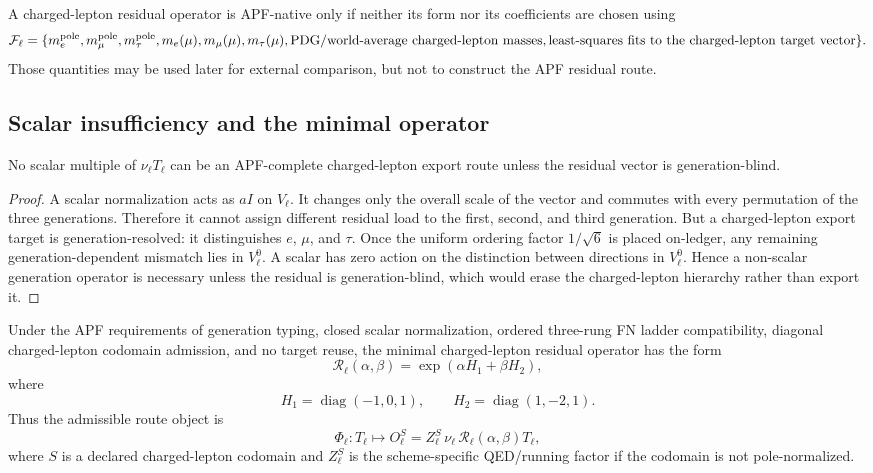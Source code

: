 \begin{definition}
A charged-lepton residual operator is APF-native only if neither its form nor its coefficients are chosen using
\[
        \mathcal F_\ell=
        \{m_e^{\rm pole},m_\mu^{\rm pole},m_\tau^{\rm pole},
        m_e(\mu),m_\mu(\mu),m_\tau(\mu),
        \hbox{PDG/world-average charged-lepton masses},
        \hbox{least-squares fits to the charged-lepton target vector}\}.
\]
Those quantities may be used later for external comparison, but not to construct the APF residual route.
\end{definition}

\subsection{Scalar insufficiency and the minimal operator}

\begin{lemma}
\label{lem:scalar-insufficiency-v38}
No scalar multiple of \(\nu_\ell T_\ell\) can be an APF-complete charged-lepton export route unless the residual vector is generation-blind.
\end{lemma}

\begin{proof}
A scalar normalization acts as \(a I\) on \(V_\ell\).  It changes only the overall scale of the vector and commutes with every permutation of the three generations.  Therefore it cannot assign different residual load to the first, second, and third generation.  But a charged-lepton export target is generation-resolved: it distinguishes \(e\), \(\mu\), and \(\tau\).  Once the uniform ordering factor \(1/\sqrt6\) is placed on-ledger, any remaining generation-dependent mismatch lies in \(V_\ell^0\).  A scalar has zero action on the distinction between directions in \(V_\ell^0\).  Hence a non-scalar generation operator is necessary unless the residual is generation-blind, which would erase the charged-lepton hierarchy rather than export it. \qedhere
\end{proof}

\begin{theorem}
\label{thm:charged-lepton-residual-operator-form-v38}
Under the APF requirements of generation typing, closed scalar normalization, ordered three-rung FN ladder compatibility, diagonal charged-lepton codomain admission, and no target reuse, the minimal charged-lepton residual operator has the form
\[
        \mathcal R_\ell(\alpha,\beta)
        =\exp\!\left(\alpha H_1+\beta H_2\right),
\]
where
\[
        H_1=\operatorname{diag}(-1,0,1),
        \qquad
        H_2=\operatorname{diag}(1,-2,1).
\]
Thus the admissible route object is
\[
        \Phi_\ell:
        T_\ell\longmapsto
        O_\ell^S
        =Z_\ell^S\,\nu_\ell\,
        \mathcal R_\ell(\alpha,\beta)T_\ell,
\]
where \(S\) is a declared charged-lepton codomain and \(Z_\ell^S\) is the scheme-specific QED/running factor if the codomain is not pole-normalized.
\end{theorem}

